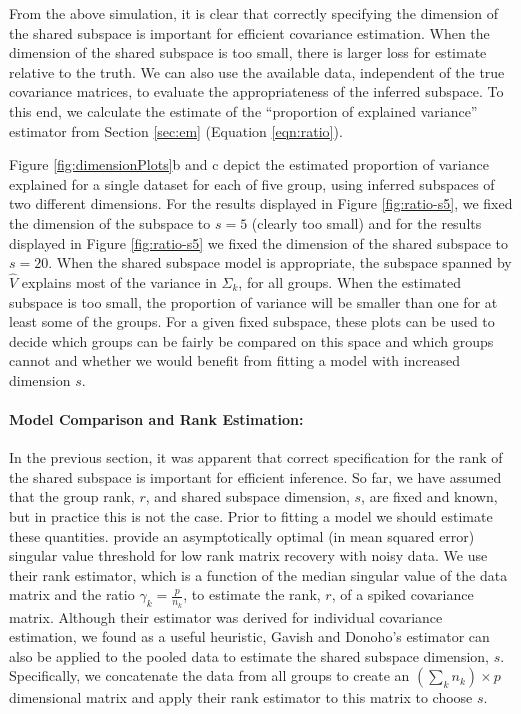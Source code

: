 \documentclass{article}
\begin{document}
From the above simulation, it is clear that correctly specifying the
dimension of the shared subspace is important for efficient covariance
estimation.  When the dimension of the shared subspace is too small,
there is larger loss for estimate relative to the truth.  We can also
use the available data, independent of the true covariance matrices,
to evaluate the appropriateness of the inferred subspace.  To this
end, we calculate the estimate of the ``proportion of explained
variance'' estimator from Section \ref{sec:em} (Equation
\ref{eqn:ratio}).

Figure \ref{fig:dimensionPlots}b and c depict the estimated proportion of
variance explained for a single dataset for each of five group, using
inferred subspaces of two different dimensions.  For the results
displayed in Figure \ref{fig:ratio-s5}, we fixed the dimension of the
subspace to $s=5$ (clearly too small) and for the results displayed in
Figure \ref{fig:ratio-s5} we fixed the dimension of the shared subspace
to $s=20$.  When the shared subspace model is appropriate, the
subspace spanned by $\hat{V}$ explains most of the variance in
$\Sigma_k$, for all groups.  When the estimated subspace is too small,
the proportion of variance will be smaller than one for at least some of the
groups.  For a given fixed subspace, these plots can be used to decide
which groups can be fairly be compared on this space and which groups
cannot and whether we would benefit from fitting a model with
increased dimension $s$.  

\paragraph{Model Comparison and Rank Estimation:}

In the previous section, it was apparent that correct specification
for the rank of the shared subspace is important for efficient
inference.  So far, we have assumed that the group rank, $r$, and
shared subspace dimension, $s$, are fixed and known, but in practice
this is not the case.  Prior to fitting a model we should estimate
these quantities.  \citet{Gavish2014} provide an asymptotically
optimal (in mean squared error) singular value threshold for low rank
matrix recovery with noisy data.  We use their rank estimator, which
is a function of the median singular value of the data matrix and the
ratio $\gamma_k =\frac{p}{n_k}$, to estimate the rank, $r$, of a
spiked covariance matrix.  Although their estimator was derived for
individual covariance estimation, we found as a useful heuristic,
Gavish and Donoho's estimator can also be applied to the pooled data
to estimate the shared subspace dimension, $s$.  Specifically, we concatenate
the data from all groups to create an $(\sum_k n_k) \times p$
dimensional matrix and apply their rank estimator to this matrix to
choose $s$.
\end{document}
